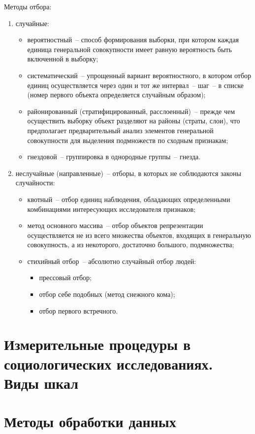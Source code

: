  Методы отбора:
  \begin{enumerate}
    \item случайные:
      \begin{itemize}
        \item вероятностный~-- способ формирования выборки, при котором каждая
          единица генеральной совокупности имеет равную вероятность быть
          включенной в выборку;
        \item систематический~-- упрощенный вариант вероятностного, в котором
          отбор единиц осуществляется через один и тот же интервал~-- шаг~-- в
          списке (номер первого объекта определяется случайным образом);
        \item районированный (стратифицированный, расслоенный)~-- прежде чем
          осуществить выборку объект разделяют на районы (страты, слои), что
          предполагает предварительный анализ элементов генеральной совокупности
          для выделения подмножеств по сходным признакам;
        \item гнездовой~-- группировка в однородные группы~-- гнезда.
      \end{itemize}
    \item неслучайные (направленные)~-- отборы, в которых не соблюдаются законы
      случайности:
      \begin{itemize}
        \item квотный~-- отбор единиц наблюдения, обладающих определенными
          комбинациями интересующих исследователя признаков;
        \item метод основного массива~-- отбор объектов репрезентации
          осуществляется не из всего множества объектов, входящих в генеральную
          совокупность, а из некоторого, достаточно большого, подмножества;
        \item стихийный отбор~-- абсолютно случайный отбор людей:
          \begin{itemize}
            \item прессовый отбор;
            \item отбор себе подобных (метод снежного кома);
            \item отбор первого встречного.
          \end{itemize}
      \end{itemize}
  \end{enumerate}

\section{Измерительные процедуры в социологических исследованиях. Виды шкал}

\section{Методы обработки данных}

